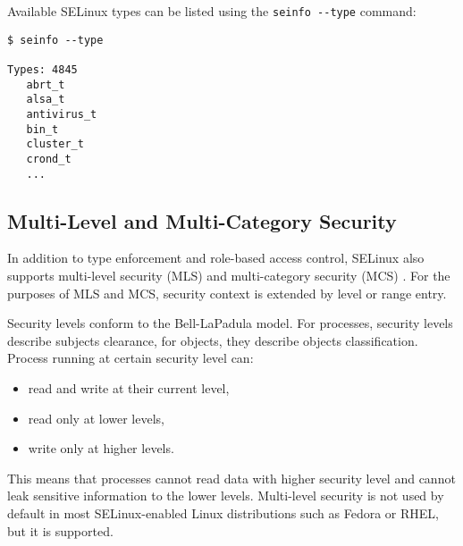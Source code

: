 Available SELinux types can be listed using the \texttt{seinfo -{}-type}
command:
\begin{lstlisting}
$ seinfo --type

Types: 4845
   abrt_t
   alsa_t
   antivirus_t
   bin_t
   cluster_t
   crond_t
   ...
\end{lstlisting}

\subsection{Multi-Level and Multi-Category Security}
\label{mls}
In addition to type enforcement and role-based access control, SELinux also
supports multi-level security (MLS) and multi-category security (MCS)
\cite[pp.~48--53]{tsn}. For the purposes of MLS and MCS, security context is
extended by level or range entry.

Security levels conform to the Bell-LaPadula model. For processes, security
levels describe subjects clearance, for objects, they describe objects
classification. Process running at certain security level can:
\begin{itemize}
    \item read and write at their current level,
    \item read only at lower levels,
    \item write only at higher levels.
\end{itemize}
This means that processes cannot read data with higher security level and
cannot leak sensitive information to the lower levels. Multi-level security is
not used by default in most SELinux-enabled Linux distributions such as Fedora
or RHEL, but it is supported.

